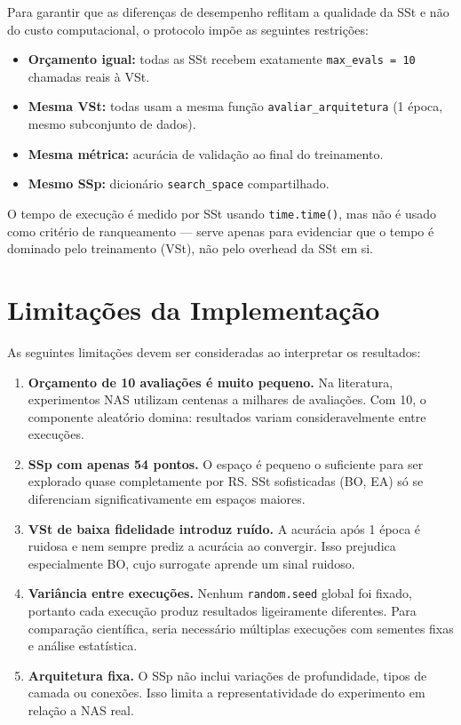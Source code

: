 \documentclass[a4paper,12pt]{article}
\begin{document}
Para garantir que as diferenças de desempenho reflitam a qualidade da SSt e não do custo computacional, o protocolo impõe as seguintes restrições:

\begin{itemize}[noitemsep]
    \item \textbf{Orçamento igual:} todas as SSt recebem exatamente \texttt{max\_evals = 10} chamadas reais à VSt.
    \item \textbf{Mesma VSt:} todas usam a mesma função \texttt{avaliar\_arquitetura} (1 época, mesmo subconjunto de dados).
    \item \textbf{Mesma métrica:} acurácia de validação ao final do treinamento.
    \item \textbf{Mesmo SSp:} dicionário \texttt{search\_space} compartilhado.
\end{itemize}

O tempo de execução é medido por SSt usando \texttt{time.time()}, mas não é usado como critério de ranqueamento — serve apenas para evidenciar que o tempo é dominado pelo treinamento (VSt), não pelo overhead da SSt em si.

\section{Limitações da Implementação}

As seguintes limitações devem ser consideradas ao interpretar os resultados:

\begin{enumerate}[noitemsep]
    \item \textbf{Orçamento de 10 avaliações é muito pequeno.} Na literatura, experimentos NAS utilizam centenas a milhares de avaliações. Com 10, o componente aleatório domina: resultados variam consideravelmente entre execuções.

    \item \textbf{SSp com apenas 54 pontos.} O espaço é pequeno o suficiente para ser explorado quase completamente por RS. SSt sofisticadas (BO, EA) só se diferenciam significativamente em espaços maiores.

    \item \textbf{VSt de baixa fidelidade introduz ruído.} A acurácia após 1 época é ruidosa e nem sempre prediz a acurácia ao convergir. Isso prejudica especialmente BO, cujo surrogate aprende um sinal ruidoso.

    \item \textbf{Variância entre execuções.} Nenhum \texttt{random.seed} global foi fixado, portanto cada execução produz resultados ligeiramente diferentes. Para comparação científica, seria necessário múltiplas execuções com sementes fixas e análise estatística.

    \item \textbf{Arquitetura fixa.} O SSp não inclui variações de profundidade, tipos de camada ou conexões. Isso limita a representatividade do experimento em relação a NAS real.
\end{enumerate}
\end{document}
